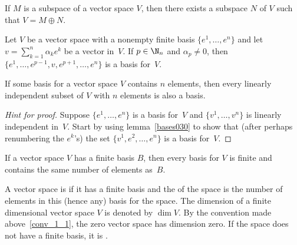\begin{prop}\label{0000824} If $M$ is a subspace of a vector space $V$, then there exists a subspace $N$ of
$V$ such that $V = M \oplus N$.
\end{prop}

\begin{lem}\label{bases030} Let $V$ be a vector space with a nonempty finite basis  $\{e^1,
\dots,e^n\}$ and let $v = \sum_{k=1}^n \alpha_k e^k$ be a vector in~$V$.  If $p \in \N_n$
and $\alpha_p \ne 0$, then $\{e^1, \dots,e^{p-1},v,e^{p+1}, \dots, e^n\}$ is a basis
for~$V$.
\end{lem}

\begin{prop}\label{bases031} If some basis for a vector space $V$ contains $n$ elements,
then every linearly independent subset of $V$ with $n$ elements is also a basis.
\end{prop}

\begin{proof}[\emph{Hint for proof}] Suppose $\{e^1,\dots,e^n\}$ is a basis for~$V$ and
$\{v^1, \dots,v^n\}$ is linearly independent in~$V$. Start by using lemma~\ref{bases030}
to show that (after perhaps renumbering the $e^k$'s) the set $\{v^1, e^2, \dots, e^n\}$
is a basis for~$V$.  \ns
\end{proof}

\begin{cor}\label{bases032} If a vector space $V$ has a finite basis $B$, then every basis
for $V$ is finite and contains the same number of elements as~$B$.
\end{cor}

\begin{defn} A vector space is
 if it has a finite basis and the
 of the space is the number of elements in this (hence any) basis for the
space. The dimension of a finite dimensional vector space $V$ is denoted by $\dim V$. By the
convention made above~\ref{conv_1_1}, the zero vector space has dimension zero.  If
the space does not have a finite basis, it is
.
\end{defn}

